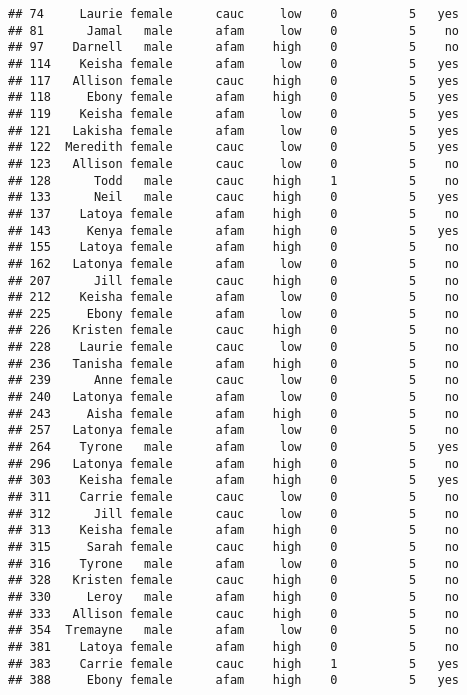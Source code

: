 \documentclass[
]{article}
\begin{document}
\begin{verbatim}
## 74     Laurie female      cauc     low    0          5   yes
## 81      Jamal   male      afam     low    0          5    no
## 97    Darnell   male      afam    high    0          5    no
## 114    Keisha female      afam     low    0          5   yes
## 117   Allison female      cauc    high    0          5   yes
## 118     Ebony female      afam    high    0          5   yes
## 119    Keisha female      afam     low    0          5   yes
## 121   Lakisha female      afam     low    0          5   yes
## 122  Meredith female      cauc     low    0          5   yes
## 123   Allison female      cauc     low    0          5    no
## 128      Todd   male      cauc    high    1          5    no
## 133      Neil   male      cauc    high    0          5   yes
## 137    Latoya female      afam    high    0          5    no
## 143     Kenya female      afam    high    0          5   yes
## 155    Latoya female      afam    high    0          5    no
## 162   Latonya female      afam     low    0          5    no
## 207      Jill female      cauc    high    0          5    no
## 212    Keisha female      afam     low    0          5    no
## 225     Ebony female      afam     low    0          5    no
## 226   Kristen female      cauc    high    0          5    no
## 228    Laurie female      cauc     low    0          5    no
## 236   Tanisha female      afam    high    0          5    no
## 239      Anne female      cauc     low    0          5    no
## 240   Latonya female      afam     low    0          5    no
## 243     Aisha female      afam    high    0          5    no
## 257   Latonya female      afam     low    0          5    no
## 264    Tyrone   male      afam     low    0          5   yes
## 296   Latonya female      afam    high    0          5    no
## 303    Keisha female      afam    high    0          5   yes
## 311    Carrie female      cauc     low    0          5    no
## 312      Jill female      cauc     low    0          5    no
## 313    Keisha female      afam    high    0          5    no
## 315     Sarah female      cauc    high    0          5    no
## 316    Tyrone   male      afam     low    0          5    no
## 328   Kristen female      cauc    high    0          5    no
## 330     Leroy   male      afam    high    0          5    no
## 333   Allison female      cauc    high    0          5    no
## 354  Tremayne   male      afam     low    0          5    no
## 381    Latoya female      afam    high    0          5    no
## 383    Carrie female      cauc    high    1          5   yes
## 388     Ebony female      afam    high    0          5   yes

\end{verbatim}
\end{document}
